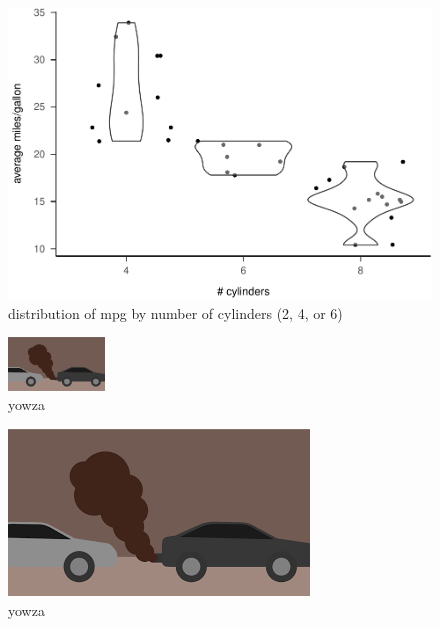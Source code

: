 \documentclass[
  english,
  man,floatsintext]{apa6}
\begin{document}
\begin{figure}
\centering
\includegraphics{example_rmd_files/figure-latex/fig-avgmpg-thmapa-1.pdf}
\caption{\label{fig:fig-avgmpg-thmapa}distribution of mpg by number of cylinders (2, 4, or 6)}
\end{figure}



\begin{figure}
\includegraphics[width=1.01in]{smog} \caption{yowza}\label{fig:fig-smog}
\end{figure}

\begin{figure}

{\centering \includegraphics[width=3\linewidth]{smog} 

}

\caption{yowza}\label{fig:fig-BIGsmog}
\end{figure}
\end{document}
